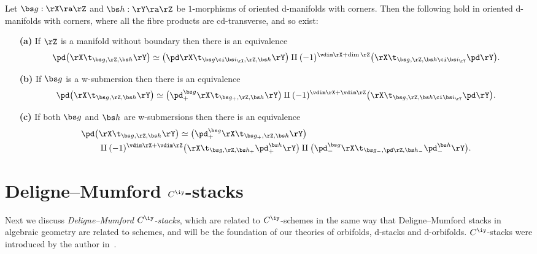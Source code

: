 \documentclass{article}
\begin{document}
\begin{prop} Let\/ $\bs g:\rX\ra\rZ$ and\/ $\bs h:\rY\ra\rZ$ be
$1$-morphisms of oriented d-manifolds with corners. Then the
following hold in oriented d-manifolds with corners, where all the
fibre products are cd-transverse, and so exist:
\begin{itemize}
\setlength{\itemsep}{0pt}
\setlength{\parsep}{0pt}
\item[{\bf(a)}] If\/ $\rZ$ is a manifold without boundary then
there is an equivalence
\begin{equation*}
\pd\bigl(\rX\t_{\bs g,\rZ,\bs h}\rY\bigr)\simeq\bigl(\pd
\rX\t_{\bs g\ci\bs i_\rX,\rZ,\bs h}\rY\bigr)\amalg
(-1)^{\vdim\rX+\dim\rZ}\bigl(\rX\t_{\bs g,\rZ,\bs h
\ci\bs i_\rY}\pd\rY\bigr).
\end{equation*}
\item[{\bf(b)}] If\/ $\bs g$ is a w-submersion then there is an
equivalence
\begin{equation*}
\pd\bigl(\rX\t_{\bs g,\rZ,\bs h}\rY\bigr)\simeq
\bigl(\pd^{\bs g}_+\rX\t_{\bs g_+,\rZ,\bs h}\rY\bigr)
\amalg(-1)^{\vdim\rX+\vdim\rZ}\bigl(\rX\t_{\bs g,\rZ, \bs
h\ci\bs i_\rY}\pd\rY\bigr).
\end{equation*}
\item[{\bf(c)}] If both\/ $\bs g$ and\/ $\bs h$ are
w-submersions then there is an equivalence
\begin{align*}
\pd\bigl(&\rX\t_{\bs g,\rZ,\bs h}\rY\bigr)\simeq
\bigl(\pd_+^{\bs g}\rX \t_{\bs g_+,\rZ,\bs h}\rY\bigr)\\
&\amalg(-1)^{\vdim\rX+\vdim\rZ}\bigl(\rX \t_{\bs g,\rZ,\bs
h_+}\pd_+^{\bs h}\rY\bigr) \amalg\bigl(\pd^{\bs g}_-\rX\t_{\bs
g_-,\pd\rZ,\bs h_-} \pd^{\bs h}_-\rY\bigr).
\end{align*}
\end{itemize}
\label{ds7prop2}
\end{prop}

\section{Deligne--Mumford $C^\iy$-stacks}
\label{ds8}

Next we discuss {\it Deligne--Mumford\/ $C^\iy$-stacks}, which are
related to $C^\iy$-schemes in the same way that Deligne--Mumford
stacks in algebraic geometry are related to schemes, and will be the
foundation of our theories of orbifolds, d-stacks and d-orbifolds.
$C^\iy$-stacks were introduced by the author in~\cite[\S 7--\S
11]{Joyc4}.
\end{document}
